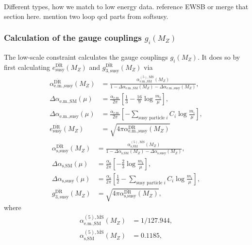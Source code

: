 \documentclass[final,3p,times,pdflatex]{elsarticle}
\newcommand{\textoverline}[1]{$\overline{\mbox{#1}}$}
\newcommand{\DRbar}{\textoverline{DR}\xspace}
\newcommand{\MSbar}{\textoverline{MS}\xspace}
\begin{document}
{\color{red}Different types, how we match to low energy data.
  reference EWSB or merge that section here.  mention two loop qcd
  parts from softsusy.}

\subsubsection{Calculation of the gauge couplings $g_i(M_Z)$}
\label{sec:calculation-of-gauge-couplings}

The low-scale constraint calculates the gauge couplings $g_i(M_Z)$.
It does so by first calculating $e_{\text{susy}}^{\text{\DRbar}}(M_Z)$
and $g_{3,\text{susy}}^{\text{\DRbar}}(M_Z)$ via
%
\begin{align}
  \alpha_{\text{e.m.},\text{susy}}^{\text{\DRbar}}(M_Z) &=
  \frac{\alpha_{\text{e.m.},\text{SM}}^{(5),\text{\MSbar}}(M_Z)}{1 -
    \Delta\alpha_{\text{e.m.},\text{SM}}(M_Z) -
    \Delta\alpha_{\text{e.m.},\text{susy}}(M_Z)} ,\\
  \Delta\alpha_{\text{e.m.},\text{SM}}(\mu) &=
  \frac{\alpha_\text{e.m.}}{2\pi} \left[\frac{1}{3}
    - \frac{16}{9} \log{\frac{m_t}{\mu}} \right],\\
  \Delta\alpha_{\text{e.m.},\text{susy}}(\mu) &=
  \frac{\alpha_\text{e.m.}}{2\pi} \left[ -\sum_{\text{susy particle }
      i}
    C_i \log{\frac{m_i}{\mu}} \right],\\
    e_{\text{susy}}^{\text{\DRbar}}(M_Z) &=
    \sqrt{4\pi\alpha_{\text{e.m.},\text{susy}}^{\text{\DRbar}}(M_Z)}
\end{align}
%
\begin{align}
  \alpha_{\text{s},\text{susy}}^{\text{\DRbar}}(M_Z) &=
  \frac{\alpha_{\text{s},\text{SM}}^{(5),\text{\MSbar}}(M_Z)}{1 -
    \Delta\alpha_{\text{s},\text{SM}}(M_Z)
    - \Delta\alpha_{\text{s},\text{susy}}(M_Z)} ,\\
  \Delta\alpha_{\text{s},\text{SM}}(\mu) &=
  \frac{\alpha_\text{s}}{2\pi} \left[
    -\frac{2}{3} \log{\frac{m_t}{\mu}} \right],\\
  \Delta\alpha_{\text{s},\text{susy}}(\mu) &=
  \frac{\alpha_\text{s}}{2\pi}\left[ \frac{1}{2}-\sum_{\text{susy
        particle } i} C_i \log{\frac{m_i}{\mu}} \right] ,\\
  g_{3,\text{susy}}^{\text{\DRbar}}(M_Z) &=
  \sqrt{4\pi\alpha_{\text{s},\text{susy}}^{\text{\DRbar}}(M_Z)} ,
\end{align}
%
where
%
\begin{align}
  \alpha_{\text{e.m.},\text{SM}}^{(5),\text{\MSbar}}(M_Z) &= 1/127.944,\\
  \alpha_{\text{s},\text{SM}}^{(5),\text{\MSbar}}(M_Z) &= 0.1185,
\end{align}
\end{document}
